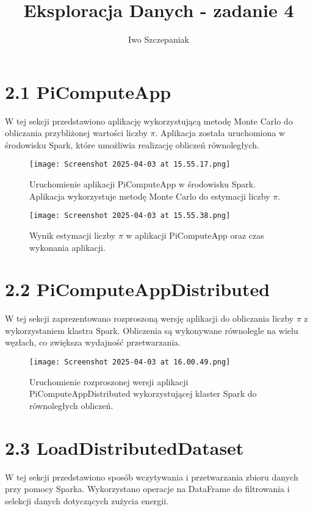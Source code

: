 \documentclass{article}
\title{Eksploracja Danych - zadanie 4}
\author{Iwo Szczepaniak}
\begin{document}
\maketitle

\section{2.1 PiComputeApp}
W tej sekcji przedstawiono aplikację wykorzystującą metodę Monte Carlo do obliczania przybliżonej wartości liczby $\pi$. Aplikacja została uruchomiona w środowisku Spark, które umożliwia realizację obliczeń równoległych.

\begin{figure}
    \centering
    \texttt{[image: Screenshot 2025-04-03 at 15.55.17.png]}
    \caption{Uruchomienie aplikacji PiComputeApp w środowisku Spark. Aplikacja wykorzystuje metodę Monte Carlo do estymacji liczby $\pi$.}
    \label{fig:enter-label}
\end{figure}
\begin{figure}
    \centering
    \texttt{[image: Screenshot 2025-04-03 at 15.55.38.png]}
    \caption{Wynik estymacji liczby $\pi$ w aplikacji PiComputeApp oraz czas wykonania aplikacji.}
    \label{fig:enter-label}
\end{figure}


\section{2.2 PiComputeAppDistributed}
W tej sekcji zaprezentowano rozproszoną wersję aplikacji do obliczania liczby $\pi$ z wykorzystaniem klastra Spark. Obliczenia są wykonywane równolegle na wielu węzłach, co zwiększa wydajność przetwarzania.

\begin{figure}
    \centering
    \texttt{[image: Screenshot 2025-04-03 at 16.00.49.png]}
    \caption{Uruchomienie rozproszonej wersji aplikacji PiComputeAppDistributed wykorzystującej klaster Spark do równoległych obliczeń.}
    \label{fig:enter-label}
\end{figure}


\section{2.3 LoadDistributedDataset}
W tej sekcji przedstawiono sposób wczytywania i przetwarzania zbioru danych przy pomocy Sparka. Wykorzystano operacje na DataFrame do filtrowania i selekcji danych dotyczących zużycia energii.
\end{document}

